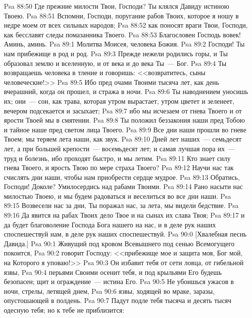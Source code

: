 \vs Psa 88:50 Где прежние милости Твои, Господи? Ты клялся Давиду истиною Твоею.
\vs Psa 88:51 Вспомни, Господи, поругание рабов Твоих, которое я ношу в недре моем от всех сильных народов;
\vs Psa 88:52 как поносят враги Твои, Господи, как бесславят следы помазанника Твоего.
\vs Psa 88:53 Благословен Господь вовек! Аминь, аминь.
\vs Psa 89:1 Молитва Моисея, человека Божия.
\rsbpar\vs Psa 89:2 Господи! Ты нам прибежище в род и род.
\vs Psa 89:3 Прежде нежели родились горы, и Ты образовал землю и вселенную, и от века и до века Ты~--- Бог.
\vs Psa 89:4 Ты возвращаешь человека в тление и говоришь: <<возвратитесь, сыны человеческие!>>
\vs Psa 89:5 Ибо пред очами Твоими тысяча лет, как день вчерашний, когда он прошел, и  стража в ночи.
\vs Psa 89:6 Ты  наводнением уносишь их; они~---  сон, как трава, которая утром вырастает, утром цветет и зеленеет, вечером подсекается и засыхает;
\vs Psa 89:7 ибо мы исчезаем от гнева Твоего и от ярости Твоей мы в смятении.
\vs Psa 89:8 Ты положил беззакония наши пред Тобою и тайное наше пред светом лица Твоего.
\vs Psa 89:9 Все дни наши прошли во гневе Твоем; мы теряем лета наши, как звук.
\vs Psa 89:10 Дней лет наших~--- семьдесят лет, а при большей крепости~--- восемьдесят лет; и самая лучшая пора их~--- труд и болезнь, ибо проходят быстро, и мы летим.
\vs Psa 89:11 Кто знает силу гнева Твоего, и ярость Твою по мере страха Твоего?
\vs Psa 89:12 Научи нас так счислять дни наши, чтобы нам приобрести сердце мудрое.
\vs Psa 89:13 Обратись, Господи! Доколе? Умилосердись над рабами Твоими.
\vs Psa 89:14 Рано насыти нас милостью Твоею, и мы будем радоваться и веселиться во все дни наши.
\vs Psa 89:15 Возвесели нас за дни,  Ты поражал нас, за лета,  мы видели бедствие.
\vs Psa 89:16 Да явится на рабах Твоих дело Твое и на сынах их слава Твоя;
\vs Psa 89:17 и да будет благоволение Господа Бога нашего на нас, и в деле рук наших споспешествуй нам, в деле рук наших споспешествуй.
\vs Psa 90:0 [Хвалебная песнь Давида.]
\rsbpar\vs Psa 90:1 Живущий под кровом Всевышнего под сенью Всемогущего покоится,
\vs Psa 90:2 говорит Господу: <<прибежище мое и защита моя, Бог мой, на Которого я уповаю!>>
\vs Psa 90:3 Он избавит тебя от сети ловца, от гибельной язвы,
\vs Psa 90:4 перьями Своими осенит тебя, и под крыльями Его будешь безопасен; щит и ограждение~--- истина Его.
\vs Psa 90:5 Не убоишься ужасов в ночи, стрелы, летящей днем,
\vs Psa 90:6 язвы, ходящей во мраке, заразы, опустошающей в полдень.
\vs Psa 90:7 Падут подле тебя тысяча и десять тысяч одесную тебя; но к тебе не приблизится:
